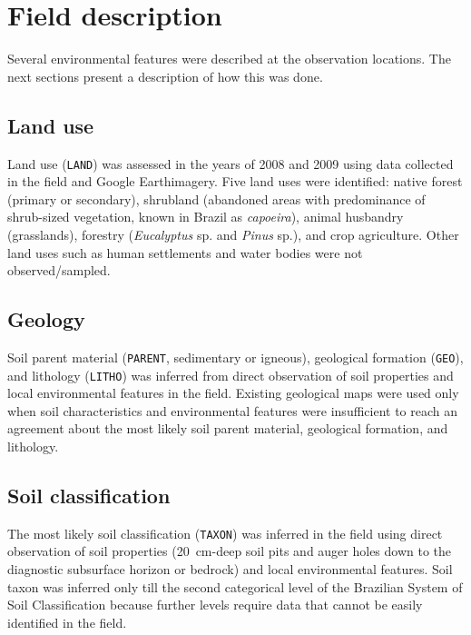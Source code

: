 \tocless\section{Field description}

Several environmental features were described at the observation locations. The next sections 
present a description of how this was done.

\tocless\subsection{Land use}

Land use (\texttt{LAND}) was assessed in the years of \num{2008} and \num{2009} using data 
collected in the field and Google Earth\textregistered imagery. Five land uses were identified: 
native forest (primary or secondary), shrubland (abandoned areas with predominance of shrub-sized 
vegetation, known in Brazil as \emph{capoeira}), animal husbandry (grasslands), forestry 
(\textit{Eucalyptus} sp. and \textit{Pinus} sp.), and crop agriculture. Other land uses such as 
human settlements and water bodies were not observed/sampled.

\tocless\subsection{Geology}

Soil parent material (\texttt{PARENT}, sedimentary or igneous), geological formation (\texttt{GEO}),
and lithology (\texttt{LITHO}) was inferred from direct observation of soil properties and local 
environmental features in the field. Existing geological maps were used only when soil 
characteristics and environmental features were insufficient to reach an agreement about the most 
likely soil parent material, geological formation, and lithology.

\tocless\subsection{Soil classification}

The most likely soil classification (\texttt{TAXON}) was inferred in the field using direct 
observation of soil properties (\SI{20}{\centi\metre}-deep soil pits and auger holes down to the 
diagnostic subsurface horizon or bedrock) and local environmental features. Soil taxon was inferred 
only till the second categorical level of the Brazilian System of Soil Classification 
\cite{SantosEtAl2013a} because further levels require data that cannot be easily identified in the 
field.

